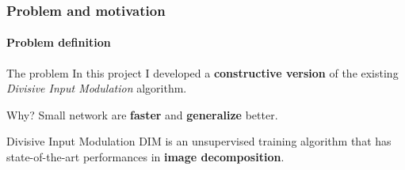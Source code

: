 \documentclass{beamer}
\begin{document}
			\begin{frame}
				\frametitle{Problem and motivation}
				\framesubtitle{Problem definition}
				\begin{exampleblock}{The problem}
					In this project I developed a \textbf{constructive version} of the existing \emph{Divisive Input Modulation} algorithm.
				\end{exampleblock}
				\begin{block}{Why?}
					Small network are \textbf{faster} and \textbf{generalize} better.
				\end{block}
				\begin{block}{Divisive Input Modulation}
					DIM is an unsupervised training algorithm that has state-of-the-art performances in \textbf{image decomposition}.
				\end{block}
			\end{frame}
		
\end{document}
